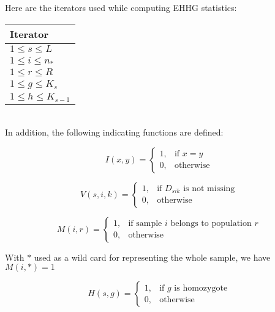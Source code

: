 \documentclass{scrartcl}
\begin{document}
\noindent Here are the iterators used while computing EHHG statistics: \\

\begin{tabular}{l}              \hline
    Iterator                 \\ \hline
    $1 \leq s \leq L$        \\
    $1 \leq i \leq n_*$      \\
    $1 \leq r \leq R$        \\
    $1 \leq g \leq K_s$      \\
    $1 \leq h \leq K_{s-1}$  \\ \hline
\end{tabular}
\\

\noindent In addition, the following indicating functions are defined:

\begin{displaymath}
    I(x,y) = \begin{cases}
        1, & \text{if } x = y \\
        0, & \text{otherwise}
    \end{cases}
\end{displaymath}

\begin{displaymath}
    V(s,i,k) = \begin{cases}
        1, & \text{if } D_{sik} \text{ is not missing} \\
        0, & \text{otherwise}
      \end{cases}
\end{displaymath}

\begin{displaymath}
    M(i,r) = \begin{cases}
        1, & \text{if sample } i \text{ belongs to population } r \\
        0, & \text{otherwise}
       \end{cases}
\end{displaymath}

With $*$ used as a wild card for representing the whole sample, we have
$M(i,*) = 1$

\begin{displaymath}
    H(s,g) = \begin{cases}
        1, & \text{if } g \text{ is homozygote} \\
        0, & \text{otherwise}
    \end{cases}
\end{displaymath}
\end{document}
